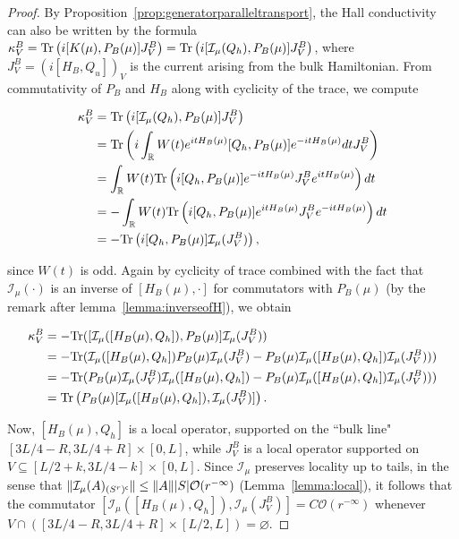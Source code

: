 \documentclass[12pt, letterpaper]{article}
\begin{document}
\begin{proof}
By Proposition~\ref{prop:generatorparalleltransport}, the Hall conductivity can also be written by the formula $\kappa_V^B = \text{Tr}\left(i[K(\mu),P_B(\mu)]J_V^B\right) = \text{Tr}\left(i[\mathcal{I}_\mu(Q_h), P_B(\mu)]J_V^B\right)$, where $J_V^B = \left(i[H_B, Q_u]\right)_V$ is the current arising from the bulk Hamiltonian. From commutativity of $P_B$ and $H_B$ along with cyclicity of the trace, we compute

\[\begin{aligned}
\kappa_V^B &= \text{Tr}\left(i[\mathcal{I}_\mu(Q_h), P_B(\mu)]J_V^B\right)\\
&= \text{Tr}\left(i\int_{\mathbb{R}} W(t) e^{itH_B(\mu)} [Q_h,P_B(\mu)] e^{-itH_B(\mu)}dt J_V^B \right)\\
&= \int_{\mathbb{R}} W(t) \text{Tr}\left(i[Q_h,P_B(\mu)] e^{-itH_B(\mu)}J_V^Be^{itH_B(\mu)}\right)dt\\
&= -\int_{\mathbb{R}} W(t) \text{Tr}\left(i[Q_h,P_B(\mu)] e^{itH_B(\mu)}J_V^Be^{-itH_B(\mu)}\right)dt\\
&=- \text{Tr}\left(i[Q_h,P_B(\mu)]\mathcal{I}_\mu(J_V^B)\right),
\end{aligned}\]

since $W(t)$ is odd. Again by cyclicity of trace combined with the fact that $\mathcal{I}_\mu(\cdot)$ is an inverse of $[H_B(\mu), \cdot]$ for commutators with $P_B(\mu)$ (by the remark after lemma~\ref{lemma:inverseofH}), we obtain

\[\begin{aligned}
\kappa_V^B &=-\text{Tr}([\mathcal{I}_\mu([H_B(\mu),Q_h]), P_B(\mu)]\mathcal{I}_\mu(J_V^B))\\
&=-\text{Tr}(\mathcal{I}_\mu([H_B(\mu),Q_h]) P_B(\mu)\mathcal{I}_\mu(J_V^B) - P_B(\mu) \mathcal{I}_\mu([H_B(\mu),Q_h])\mathcal{I}_\mu(J_V^B)) )\\
&=-\text{Tr}(P_B(\mu)\mathcal{I}_\mu(J_V^B) \mathcal{I}_\mu([H_B(\mu),Q_h]) - P_B(\mu) \mathcal{I}_\mu([H_B(\mu),Q_h])\mathcal{I}_\mu(J_V^B)) )\\
&= \text{Tr}\left( P_B(\mu)[\mathcal{I_\mu}([H_B(\mu),Q_h]), \mathcal{I}_\mu(J_V^B)]\right).
\end{aligned}\]

Now, $[H_B(\mu), Q_h]$ is a local operator, supported on the ``bulk line" $[3L/4-R, 3L/4+R] \times [0, L]$, while $J_V^B$ is a local operator supported on $V \subseteq [L/2+k, 3L/4-k] \times [0,L]$. Since $\mathcal{I}_\mu$ preserves locality up to tails, in the sense that $\lVert \mathcal{I}_\mu(A)_{(S^r)^\mathsf{c}} \rVert \leq \lVert A \rVert |S| \mathcal{O}(r^{-\infty})$ (Lemma~\ref{lemma:local}), it follows that the commutator $[\mathcal{I_\mu}([H_B(\mu),Q_h]), \mathcal{I}_\mu(J_V^B)] = C\mathcal{O}(r^{-\infty})$ whenever $V \cap ([3L/4-R, 3L/4+R] \times [L/2, L]) = \varnothing$.


\end{proof}
\end{document}
